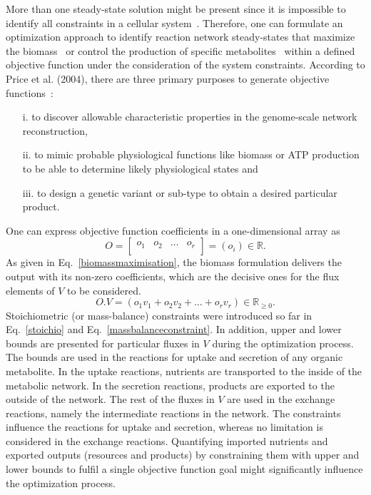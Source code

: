 More than one steady-state solution might be present since it is impossible to identify all constraints in a cellular system~\cite{KAUFFMAN2003491}. Therefore, one can formulate an optimization approach to identify reaction network steady-states that maximize the biomass~\cite{KAUFFMAN2003491,PRICE2004} or control the production of specific metabolites~\cite{VARMA1993} within a defined objective function under the consideration of the system constraints. According to Price et al. (2004),
there are three primary purposes to generate objective functions~\cite{PRICE2004}:
\begin{itemize}
	\item[i.] to discover allowable characteristic properties in the genome-scale network reconstruction,
	\item[ii.] to mimic probable physiological functions like biomass or ATP production to be able to determine likely physiological states and
	\item[iii.] to design a genetic variant or sub-type to obtain a desired particular product.
\end{itemize}

One can express objective function coefficients in a one-dimensional array as
\begin{equation} %
	O =  \begin{bmatrix}
		o_{1} & o_{2} & \dots  & o_{r}\\
	\end{bmatrix}=(o_{i})\in \mathbb{R}.
	\label{objectivecoefficients}
\end{equation}
As given in Eq.~\eqref{biomassmaximisation}, the biomass formulation delivers the output with its non-zero coefficients, which are the decisive ones for the flux elements of $V$ to be considered.
\begin{equation} %
	O.V = (o_{1}v_{1} + o_{2}v_{2} + \dots + o_{r}v_{r})\in \mathbb{R}_{\ge0}.
	\label{biomassmaximisation}
\end{equation}
Stoichiometric (or mass-balance) constraints were introduced so far in Eq.~\eqref{stoichio} and Eq.~\eqref{massbalanceconstraint}. In addition, upper and lower bounds are presented for particular fluxes in $V$ during the optimization process. The bounds are used in the reactions for uptake and secretion of any organic metabolite. In the uptake reactions, nutrients are transported to the inside of the metabolic network. In the secretion reactions, products are exported to the outside of the network. The rest of the fluxes in $V$ are used in the exchange reactions, namely the intermediate reactions in the network. The constraints influence the reactions for uptake and secretion, whereas no limitation is considered in the exchange reactions. Quantifying imported nutrients and exported outputs (resources and products) by constraining them with upper and lower bounds to fulfil a single objective function goal might significantly influence the optimization process.

